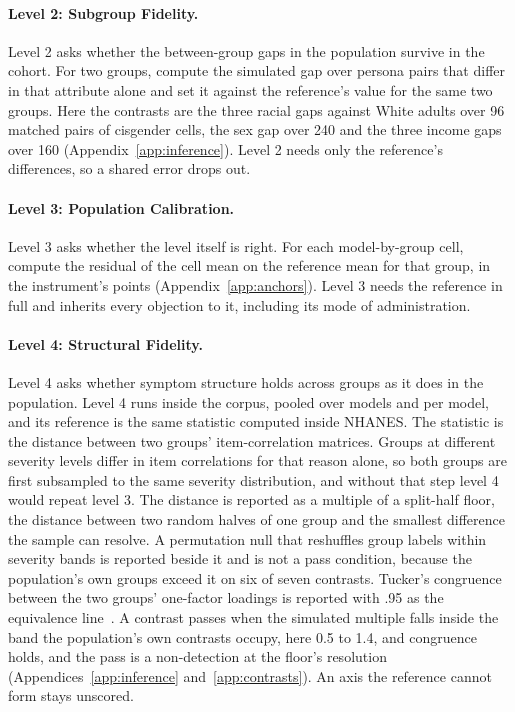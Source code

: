 \documentclass[wcp]{jmlr}
\let\cite\citep
\begin{document}
\paragraph{Level 2: Subgroup Fidelity.}
\label{sec:l2}
Level 2 asks whether the
between-group gaps in the population survive in the cohort. For two groups, compute the
simulated gap over persona pairs that differ in that attribute alone and set it against the
reference's value for the same two groups. Here the contrasts are the three racial gaps against White adults over 96 matched pairs of cisgender cells, the sex gap over 240 and the three income gaps over 160 (Appendix~\ref{app:inference}). Level 2 needs only the reference's differences, so a shared error drops out.

\paragraph{Level 3: Population Calibration.}
\label{sec:l3}
Level 3 asks whether the level itself is right. For each model-by-group cell, compute the
residual of the cell mean on the reference mean for that group, in the instrument's points (Appendix~\ref{app:anchors}). Level 3 needs the reference in full and
inherits every objection to it, including its mode of administration.

\paragraph{Level 4: Structural Fidelity.}
\label{sec:l4}
Level 4 asks whether symptom structure holds across groups as it does in the population. Level 4 runs inside the corpus, pooled over models and per model, and its reference is the same statistic computed inside NHANES. The statistic is the distance between two groups' item-correlation matrices. Groups at different severity levels differ in item correlations for that reason alone, so both groups are first subsampled to the same severity distribution, and without that step level 4 would repeat level 3. The distance is reported as a multiple of a split-half floor, the distance between two random halves of one group and the smallest difference the sample can resolve. A permutation null that reshuffles group labels within severity bands is reported beside it and is not a pass condition, because the population's own groups exceed it on six of seven contrasts. Tucker's congruence between the two groups' one-factor loadings is reported with .95 as the equivalence line~\cite{lorenzoseva2006congruence}. A contrast passes when the simulated multiple falls inside the band the population's own contrasts occupy, here 0.5 to 1.4, and congruence holds, and the pass is a non-detection at the floor's resolution (Appendices~\ref{app:inference} and~\ref{app:contrasts}). An axis the reference cannot form stays unscored.
\end{document}
